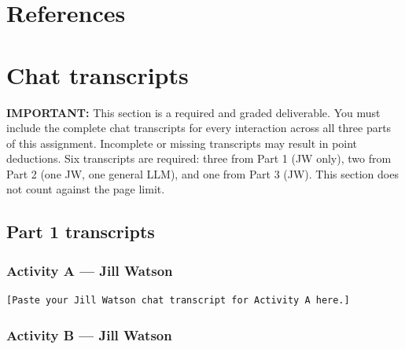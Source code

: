 \documentclass[
	letterpaper, %
]{jdf}
\begin{document}
\section{References}
\printbibliography[heading=none]


\section{Chat transcripts}

\textbf{IMPORTANT:} This section is a required and graded deliverable. You must include the complete chat transcripts for every interaction across all three parts of this assignment. Incomplete or missing transcripts may result in point deductions. Six transcripts are required: three from Part 1 (JW only), two from Part 2 (one JW, one general LLM), and one from Part 3 (JW). This section does not count against the page limit.


\subsection{Part 1 transcripts}

\subsubsection{Activity A --- Jill Watson}

\begin{verbatim}
[Paste your Jill Watson chat transcript for Activity A here.]
\end{verbatim}

\subsubsection{Activity B --- Jill Watson}
\end{document}
